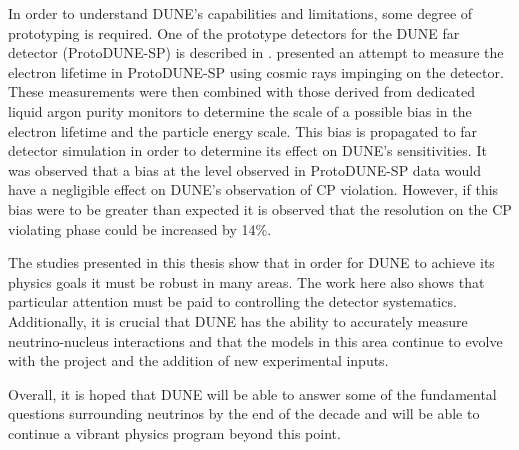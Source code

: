 In order to understand DUNE's capabilities and limitations, some degree of prototyping is required.
One of the prototype detectors for the DUNE far detector (ProtoDUNE-SP) is described in .
 presented an attempt to measure the electron lifetime in ProtoDUNE-SP using cosmic rays impinging on the detector.
These measurements were then combined with those derived from dedicated liquid argon purity monitors to determine the scale of a possible bias in the electron lifetime and the particle energy scale.
This bias is propagated to far detector simulation in order to determine its effect on DUNE's sensitivities.
It was observed that a bias at the level observed in ProtoDUNE-SP data would have a negligible effect on DUNE's observation of CP violation.
However, if this bias were to be greater than expected it is observed that the resolution on the CP violating phase could be increased by 14\%.

The studies presented in this thesis show that in order for DUNE to achieve its physics goals it must be robust in many areas.
The work here also shows that particular attention must be paid to controlling the detector systematics.
Additionally, it is crucial that DUNE has the ability to accurately measure neutrino-nucleus interactions and that the models in this area continue to evolve with the project and the addition of new experimental inputs.

Overall, it is hoped that DUNE will be able to answer some of the fundamental questions surrounding neutrinos by the end of the decade and will be able to continue a vibrant physics program beyond this point.
